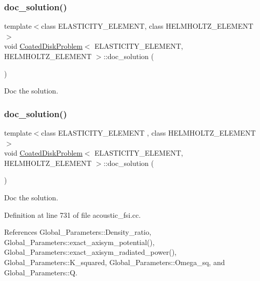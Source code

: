 \subsubsection{\texorpdfstring{doc\+\_\+solution()}{doc\_solution()}\hspace{0.1cm}{\footnotesize\ttfamily [1/2]}}
{\footnotesize\ttfamily template$<$class E\+L\+A\+S\+T\+I\+C\+I\+T\+Y\+\_\+\+E\+L\+E\+M\+E\+NT, class H\+E\+L\+M\+H\+O\+L\+T\+Z\+\_\+\+E\+L\+E\+M\+E\+NT$>$ \\
void \hyperlink{classCoatedDiskProblem}{Coated\+Disk\+Problem}$<$ E\+L\+A\+S\+T\+I\+C\+I\+T\+Y\+\_\+\+E\+L\+E\+M\+E\+NT, H\+E\+L\+M\+H\+O\+L\+T\+Z\+\_\+\+E\+L\+E\+M\+E\+NT $>$\+::doc\+\_\+solution (\begin{DoxyParamCaption}{ }\end{DoxyParamCaption})}



Doc the solution. 

\mbox{\label{classCoatedDiskProblem_af8e103d494f526c0e24c0c4ccef4ea6b}} 
\subsubsection{\texorpdfstring{doc\+\_\+solution()}{doc\_solution()}\hspace{0.1cm}{\footnotesize\ttfamily [2/2]}}
{\footnotesize\ttfamily template$<$class E\+L\+A\+S\+T\+I\+C\+I\+T\+Y\+\_\+\+E\+L\+E\+M\+E\+NT , class H\+E\+L\+M\+H\+O\+L\+T\+Z\+\_\+\+E\+L\+E\+M\+E\+NT $>$ \\
void \hyperlink{classCoatedDiskProblem}{Coated\+Disk\+Problem}$<$ E\+L\+A\+S\+T\+I\+C\+I\+T\+Y\+\_\+\+E\+L\+E\+M\+E\+NT, H\+E\+L\+M\+H\+O\+L\+T\+Z\+\_\+\+E\+L\+E\+M\+E\+NT $>$\+::doc\+\_\+solution (\begin{DoxyParamCaption}{ }\end{DoxyParamCaption})}



Doc the solution. 



Definition at line 731 of file acoustic\+\_\+fsi.\+cc.



References Global\+\_\+\+Parameters\+::\+Density\+\_\+ratio, Global\+\_\+\+Parameters\+::exact\+\_\+axisym\+\_\+potential(), Global\+\_\+\+Parameters\+::exact\+\_\+axisym\+\_\+radiated\+\_\+power(), Global\+\_\+\+Parameters\+::\+K\+\_\+squared, Global\+\_\+\+Parameters\+::\+Omega\+\_\+sq, and Global\+\_\+\+Parameters\+::Q.



